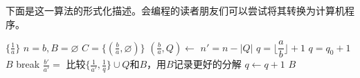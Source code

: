 下面是这一算法的形式化描述。会编程的读者朋友们可以尝试将其转换为计算机程序。

\begin{algorithmic}[1]
    \State \Return $\{\frac{1}{a}\}$
  \EndIf
  \State $n = b, B = \varnothing$
  \State $C = \{(\frac{b}{a}, \varnothing)\}$
    \State $(\frac{b}{a}, Q) \gets $   
    \State $n' = n - |Q|$                            
    \State $q = \lfloor \dfrac{a}{b} \rfloor + 1$
      
      \State $q = q_0 + 1$
    \EndIf
       
        \State \Return $B$
      \EndIf
       
        \State break
      \EndIf
      \State $\frac{b'}{a'} = $  
        \State 比较$\{\frac{1}{a'}, \frac{1}{q}\} \cup Q$和$B$，用$B$记录更好的分解
      \Else
        \State {} 
      \EndIf
      \State $q \gets q + 1$
    \EndWhile
  \EndWhile
  \State \Return $B$
\EndFunction
\end{algorithmic}





